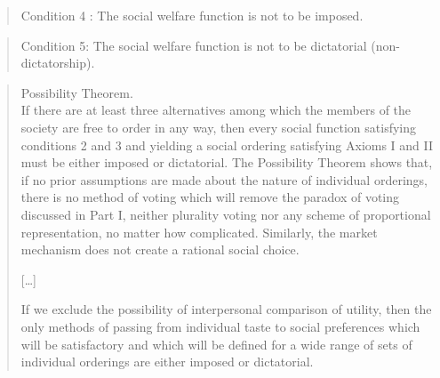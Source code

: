 \blockcquote{arrow_difficulty_1950}{
Condition 4 : The social welfare function is not to be imposed.}

\blockcquote{arrow_difficulty_1950}{
Condition 5: The social welfare function is not to be dictatorial (non-dictatorship).}

\blockcquote{arrow_difficulty_1950}{
Possibility Theorem.\\
If there are at least three alternatives among which the members of the society are free to order in any way, then every social function satisfying conditions 2 and 3 and yielding a social ordering satisfying Axioms I and II must be either imposed or dictatorial.
The Possibility Theorem shows that, if no prior assumptions are made about the nature of individual orderings, there is no method of voting which will remove the paradox of voting discussed in Part I, neither plurality voting nor any scheme of proportional representation, no matter how complicated. Similarly, the market mechanism does not create a rational social choice.

[\ldots]

If we exclude the possibility of interpersonal comparison of utility, then the only methods of passing from individual taste to social preferences which will be satisfactory and which will be defined for a wide range of sets of individual orderings are either imposed or dictatorial.}
